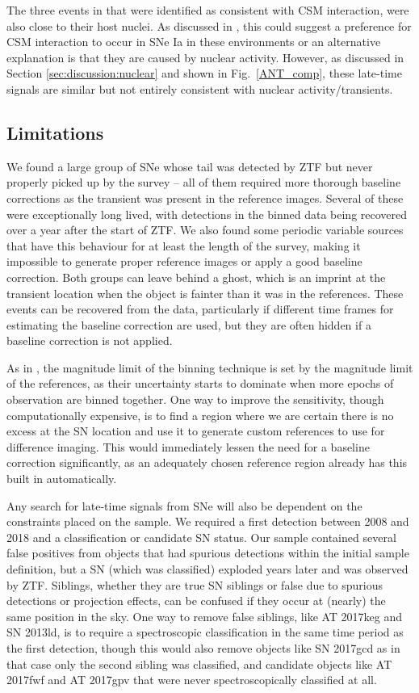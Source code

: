 \documentclass[a4paper,oneside,12pt, class=Latex/Classes/PhDthesisPSnPDF, crop=false]{standalone}
\begin{document}
The three events in \citet{Terwel_2024_paper1} that were identified as consistent with CSM interaction, were also close to their host nuclei. As discussed in \citet{Terwel_2024_paper1}, this could suggest a preference for CSM interaction to occur in SNe Ia in these environments or an alternative explanation is that they are caused by nuclear activity. However, as discussed in Section \ref{sec:discussion:nuclear} and shown in Fig.~\ref{ANT_comp}, these late-time signals are similar but not entirely consistent with nuclear activity/transients.


\subsection{Limitations}
\label{sec:discussion:limitations}
We found a large group of SNe whose tail was detected by ZTF but never properly picked up by the survey -- all of them required more thorough baseline corrections as the transient was present in the reference images. Several of these were exceptionally long lived, with detections in the binned data being recovered over a year after the start of ZTF. We also found some periodic variable sources that have this behaviour for at least the length of the survey, making it impossible to generate proper reference images or apply a good baseline correction. Both groups can leave behind a ghost, which is an imprint at the transient location when the object is fainter than it was in the references. These events can be recovered from the data, particularly if different time frames for estimating the baseline correction are used, but they are often hidden if a baseline correction is not applied. 

As in \citet{Terwel_2024_paper1}, the magnitude limit of the binning technique is set by the magnitude limit of the references, as their uncertainty starts to dominate when more epochs of observation are binned together. One way to improve the sensitivity, though computationally expensive, is to find a region where we are certain there is no excess at the SN location and use it to generate custom references to use for difference imaging. This would immediately lessen the need for a baseline correction significantly, as an adequately chosen reference region already has this built in automatically.

Any search for late-time signals from SNe will also be dependent on the constraints placed on the sample. We required a first detection between 2008 and 2018 and a classification or candidate SN status. Our sample contained several false positives from objects that had spurious detections within the initial sample definition, but a SN (which was classified) exploded years later and was observed by ZTF. Siblings, whether they are true SN siblings or false due to spurious detections or projection effects, can be confused if they occur at (nearly) the same position in the sky. One way to remove false siblings, like AT 2017keg and SN 2013ld, is to require a spectroscopic classification in the same time period as the first detection, though this would also remove objects like SN 2017gcd as in that case only the second sibling was classified, and candidate objects like AT 2017fwf and AT 2017gpv that were never spectroscopically classified at all.
\end{document}
